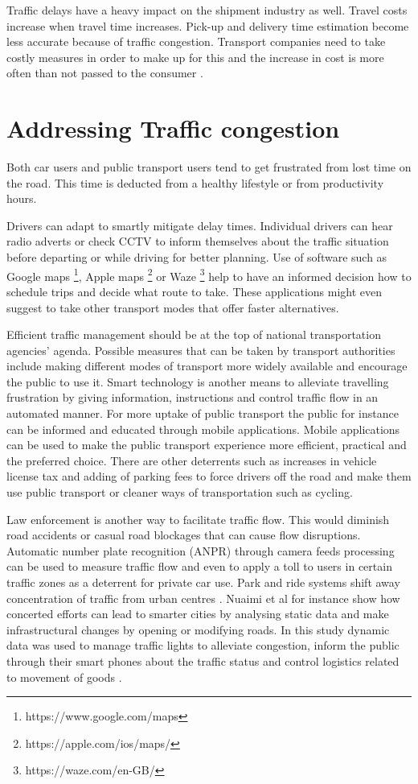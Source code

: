 \documentclass[12pt, a4paper]{report}
\theoremstyle{definition}
\theoremstyle{definition}%
\theoremstyle{definition}%
\theoremstyle{definition}%
\theoremstyle{definition}%
\theoremstyle{definition}%
\begin{document}
Traffic delays have a heavy impact on the shipment industry as well. Travel costs increase when travel time increases.  Pick-up and delivery time estimation become less accurate because of traffic congestion. Transport companies need to take costly measures in order to make up for this and the increase in cost is more often than not passed to the consumer  \cite{Schrank.2015} \cite{CambridgeSystematicsInc.2005}.

\section{Addressing Traffic congestion} \label{section:introduction:addressing_traffic_congestion}

Both car users and public transport users tend to get frustrated from lost time on the road. This time is deducted from a healthy lifestyle or from productivity hours. 

Drivers can adapt to smartly mitigate delay times. Individual drivers can hear radio adverts or check CCTV to inform themselves about the traffic situation before departing or while driving for better planning. Use of software such as Google maps  \footnote{https://www.google.com/maps}, Apple maps \footnote{https://apple.com/ios/maps/} or Waze \footnote{https://waze.com/en-GB/} help to have an informed decision how to schedule trips and decide what route to take.  These applications might even suggest to take other transport modes that offer faster alternatives.

Efficient traffic management should be at the top of national transportation agencies' agenda. Possible measures that can be taken by transport authorities include making different modes of transport more widely available and encourage the public to use it. Smart technology is another means to alleviate travelling frustration by giving information, instructions and control traffic flow in an automated manner. For more uptake of public transport the public for instance can be informed and educated through mobile applications.  Mobile applications can be used to make the public transport experience more efficient, practical and the preferred choice. There are other deterrents such as increases in vehicle license tax and adding of parking fees to force drivers off the road and make them use public transport or cleaner ways of transportation such as cycling.

Law enforcement is another way to facilitate traffic flow. This would diminish road accidents or casual road blockages that can cause flow disruptions. Automatic number plate recognition (ANPR) through camera feeds processing can be used to measure traffic flow and even to apply a toll to users in certain traffic zones as a deterrent for private car use.  Park and ride systems shift away concentration of traffic from urban centres \cite{Attard2015}.  Nuaimi et al for instance show how concerted efforts can lead to smarter cities by analysing static data and make infrastructural changes by opening or modifying roads. In this study dynamic data was used to manage traffic lights to alleviate congestion, inform the public through their smart phones about the traffic status and control logistics related to movement of goods \cite{AlNuaimi2015}.
\end{document}
